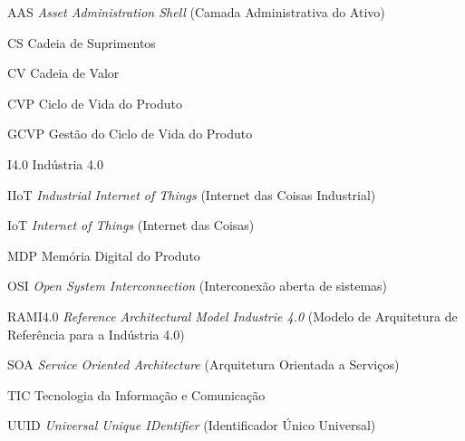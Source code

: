 \documentclass[
	12pt,				%
	oneside,			%
	a4paper,			%
	english,			%
	brazil				%
]{abntex2}
\begin{document}
\listoffigures*
\cleardoublepage



\listoftables*
\cleardoublepage

\begin{siglas}
	\item[AAS] \textit{Asset Administration Shell} (Camada Administrativa do Ativo)
	\item[CS] Cadeia de Suprimentos
	\item[CV] Cadeia de Valor
	\item[CVP] Ciclo de Vida do Produto
	\item[GCVP] Gestão do Ciclo de Vida do Produto
	\item[I4.0] Indústria 4.0
	\item[IIoT] \textit{Industrial Internet of Things} (Internet das Coisas Industrial)
	\item[IoT] \textit{Internet of Things} (Internet das Coisas)
	\item[MDP] Memória Digital do Produto
	\item[OSI] \textit{Open System Interconnection} (Interconexão aberta de sistemas)
	\item[RAMI4.0] \textit{Reference Architectural Model Industrie 4.0} (Modelo de Arquitetura de Referência para a Indústria 4.0)
	\item[SOA] \textit{Service Oriented Architecture} (Arquitetura Orientada a Serviços)
  	\item[TIC] Tecnologia da Informação e Comunicação
  	\item[UUID] \textit{Universal Unique IDentifier} (Identificador Único Universal)
  	
  	
  	
\end{siglas}


\tableofcontents*
\cleardoublepage
\end{document}
